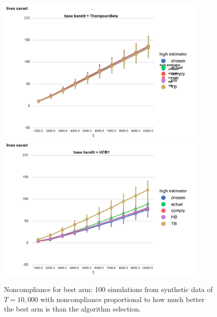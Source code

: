 \begin{figure}[t]
	\includegraphics[width=0.9\textwidth]{bandit/figs/ex4-3.jpg}\hspace{1cm}
	\includegraphics[width=0.9\textwidth]{bandit/figs/ex4-4.jpg}\hspace{1cm}
	\label{fig:ex4}
	\caption{Noncompliance for best arm: 100 simulations from synthetic data of $T=10,000$ with noncompliance proportional to how much better the best arm is than the algorithm selection.}
\end{figure}




